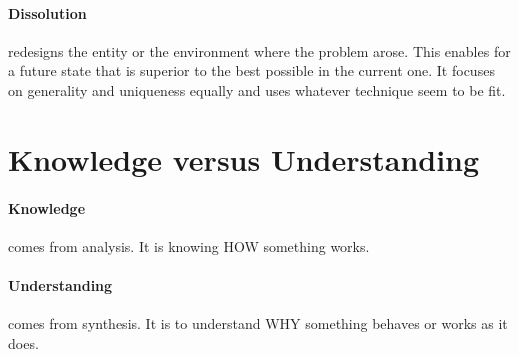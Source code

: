 \documentclass{scrartcl}
\begin{document}
\paragraph{Dissolution} redesigns the entity or the environment where the problem arose. This enables for a future state that is superior to the best possible in the current one. It focuses on generality and uniqueness equally and uses whatever technique seem to be fit.

\section{Knowledge versus Understanding}
\paragraph{Knowledge} comes from analysis. It is knowing HOW something works.
\paragraph{Understanding} comes from synthesis. It is to understand WHY something behaves or works as it does.

\newpage



\end{document}

